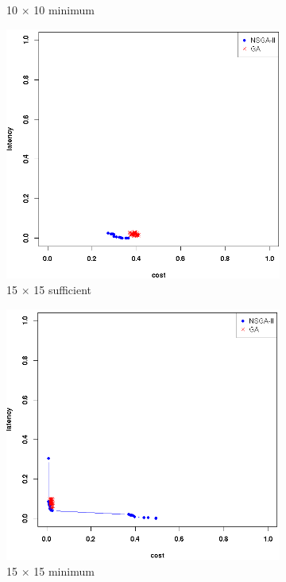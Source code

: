 \documentclass{llncs}
\begin{document}
\begin{figure}[H]
\begin{subfigure}[b]{0.45\textwidth}
		\caption{10 $\times$ 10 minimum}
	\end{subfigure}
	\begin{subfigure}[b]{0.45\textwidth}
		\includegraphics[width=\textwidth]{pics/pop_50_gen_50_15_times_15_suff.png}
		\caption{15 $\times$ 15 sufficient}
	\end{subfigure}
	\begin{subfigure}[b]{0.45\textwidth}
		\includegraphics[width=\textwidth]{pics/pop_50_gen_50_15_times_15_minimum.png}
		\caption{15 $\times$ 15 minimum}
	\end{subfigure}
	\caption{}\label{fig:c2}
\end{figure}
\end{document}
